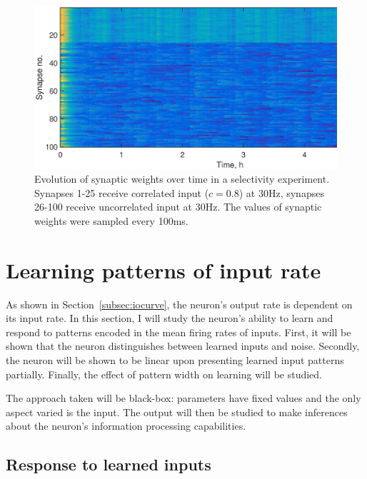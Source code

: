 \documentclass[a4paper,12pt]{report}
\theoremstyle{definition}
\begin{document}
\begin{figure}[h]
    \includegraphics[width=\textwidth]{figures/valid_selectivity_correlation.eps}
    \caption{Evolution of synaptic weights over time in a selectivity experiment. Synapses 1-25 receive correlated input ($c=0.8$) at 30Hz, synapses 26-100 receive uncorrelated input at 30Hz. The values of synaptic weights were sampled every 100ms.}
    \label{fig:selectivity_correlation}
\end{figure}









\section{Learning patterns of input rate}

As shown in Section~\ref{subsec:iocurve}, the neuron's output rate is dependent on its input rate. In this section, I will study the neuron's ability to learn and respond to patterns encoded in the mean firing rates of inputs. First, it will be shown that the neuron distinguishes between learned inputs and noise. Secondly, the neuron will be shown to be linear upon presenting learned input patterns partially. Finally, the effect of pattern width on learning will be studied.

The approach taken will be black-box: parameters have fixed values and the only aspect varied is the input. The output will then be studied to make inferences about the neuron's information processing capabilities.

\subsection{Response to learned inputs}
\label{subsec:learnedinputs}
\end{document}
